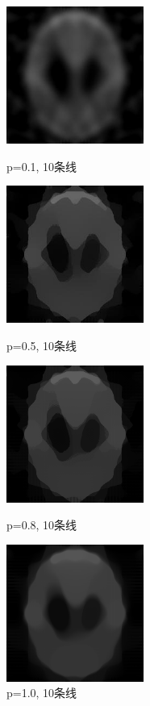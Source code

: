 \documentclass{ctexart}
\begin{document}
\begin{figure}[H]
\begin{minipage}[t]{0.4\linewidth}%
\centering     %
\includegraphics[width=4.5cm]{assets/01}
\caption{\small p=0.1, 10条线}%
\label{fig: Figure1}
\end{minipage} 
\hfill
\begin{minipage}[t]{0.4\linewidth}
\centering
\includegraphics[width=4.5cm]{assets/05}
\caption{\small p=0.5, 10条线}%
\label{fig: Figure2}
\end{minipage}
\begin{minipage}[t]{0.4\linewidth}%
\centering     %
\includegraphics[width=4.5cm]{assets/08}
\caption{\small p=0.8, 10条线}%
\label{fig: Figure3}
\end{minipage} 
\hfill
\begin{minipage}[t]{0.4\linewidth}
\centering
\includegraphics[width=4.5cm]{assets/10}
\caption{\small p=1.0, 10条线}%
\label{fig: Figure4}
\end{minipage}
\end{figure}
\end{document}
